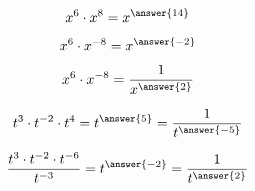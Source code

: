 \documentclass{ximera}
\author{Lee Wayand}
\begin{document}
\begin{exercise}








\begin{question}


\[
x^6 \cdot x^8 = x^{\answer{14}}
\]

\end{question}






\begin{question}


\[
x^6 \cdot x^{-8} = x^{\answer{-2}}
\]

\end{question}








\begin{question}


\[
x^6 \cdot x^{-8} = \frac{1}{x^{\answer{2}}}
\]

\end{question}









\begin{question}


\[
t^3 \cdot t^{-2} \cdot t^{4} =  t^{\answer{5}}   =  \frac{1}{t^{\answer{-5}}}
\]

\end{question}









\begin{question}


\[
\frac{t^3 \cdot t^{-2} \cdot t^{-6}}{t^{-3}} =  t^{\answer{-2}}   =  \frac{1}{t^{\answer{2}}}
\]

\end{question}






\end{exercise}
\end{document}
